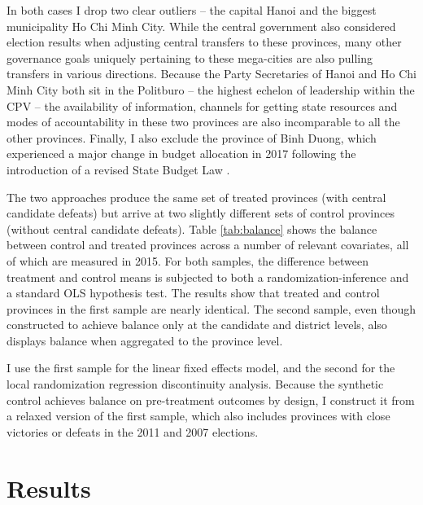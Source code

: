 \documentclass[12pt]{article}
\newcommand{\1}{\mathbbm{1}}
\begin{document}
In both cases I drop two clear outliers -- the capital Hanoi and the biggest municipality Ho Chi Minh City. While the central government also considered election results when adjusting central transfers to these provinces, many other governance goals uniquely pertaining to these mega-cities are also pulling transfers in various directions. Because the Party Secretaries of Hanoi and Ho Chi Minh City both sit in the Politburo -- the highest echelon of leadership within the CPV -- the availability of information, channels for getting state resources and modes of accountability in these two provinces are also incomparable to all the other provinces. Finally, I also exclude the province of Binh Duong, which experienced a major change in budget allocation in 2017 following the introduction of a revised State Budget Law \citep{BaoViet2016}.

The two approaches produce the same set of treated provinces (with central candidate defeats) but arrive at two slightly different sets of control provinces (without central candidate defeats). 
Table \ref{tab:balance} shows the balance between control and treated provinces across a number of relevant covariates, all of which are measured in 2015. %
For both samples, the difference between treatment and control means is subjected to both a randomization-inference and a standard OLS hypothesis test. The results show that treated and control provinces in the first sample are nearly identical. The second sample, even though constructed to achieve balance only at the candidate and district levels, also displays balance when aggregated to the province level. 

I use the first sample for the linear fixed effects model, and the second for the local randomization regression discontinuity analysis. Because the synthetic control achieves balance on pre-treatment outcomes by design, I construct it from a relaxed version of the first sample, which also includes provinces with close victories or defeats in the 2011 and 2007 elections.



\section*{Results}
\label{sec:results}

\end{document}
